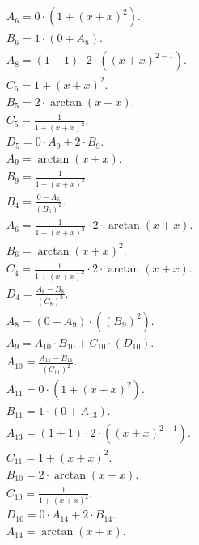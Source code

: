 \documentclass[12pt,a4paper]{extreport}
\begin{document}
\begin{multline}
\\
A_{6} = 0 \cdot (1 + (x + x) ^ {2}).\\
B_{6} = 1 \cdot (0 + A_{8}).\\
A_{8} = (1 + 1) \cdot 2 \cdot ((x + x) ^ {2 - 1}).\\
C_{6} = 1 + (x + x) ^ {2}.\\
B_{5} = 2 \cdot \arctan(x + x).\\
C_{5} = \frac{1}{1 + (x + x) ^ {2}}.\\
D_{5} = 0 \cdot A_{9} + 2 \cdot B_{9}.\\
A_{9} = \arctan(x + x).\\
B_{9} = \frac{1}{1 + (x + x) ^ {2}}.\\
B_{4} = \frac{0 - A_{6}}{(B_{6}) ^ {2}}.\\
A_{6} = \frac{1}{1 + (x + x) ^ {2}} \cdot 2 \cdot \arctan(x + x).\\
B_{6} = \arctan(x + x) ^ {2}.\\
C_{4} = \frac{1}{1 + (x + x) ^ {2}} \cdot 2 \cdot \arctan(x + x).\\
D_{4} = \frac{A_{8} - B_{8}}{(C_{8}) ^ {2}}.\\
A_{8} = (0 - A_{9}) \cdot ((B_{9}) ^ {2}).\\
A_{9} = A_{10} \cdot B_{10} + C_{10} \cdot (D_{10}).\\
A_{10} = \frac{A_{11} - B_{11}}{(C_{11}) ^ {2}}.\\
A_{11} = 0 \cdot (1 + (x + x) ^ {2}).\\
B_{11} = 1 \cdot (0 + A_{13}).\\
A_{13} = (1 + 1) \cdot 2 \cdot ((x + x) ^ {2 - 1}).\\
C_{11} = 1 + (x + x) ^ {2}.\\
B_{10} = 2 \cdot \arctan(x + x).\\
C_{10} = \frac{1}{1 + (x + x) ^ {2}}.\\
D_{10} = 0 \cdot A_{14} + 2 \cdot B_{14}.\\
A_{14} = \arctan(x + x).\\
\end{multline}
\end{document}
